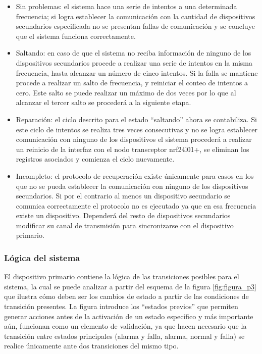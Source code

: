 \begin{itemize}
\item Sin problemas: el sistema hace una serie de intentos a una determinada frecuencia; si logra establecer la comunicación con la cantidad de dispositivos secundarios especificada no se presentan fallas de comunicación y se concluye que el sistema funciona correctamente.
\item Saltando: en caso de que el sistema no reciba información de ninguno de los dispositivos secundarios procede a realizar una serie de intentos en la misma frecuencia, hasta alcanzar un número de cinco intentos. Si la falla se mantiene procede a realizar un salto de frecuencia, y reiniciar el conteo de intentos a cero. Este salto se puede realizar un máximo de dos veces por lo que al alcanzar el tercer salto se procederá a la siguiente etapa. 
\item Reparación: el ciclo descrito para el estado ``saltando'' ahora se contabiliza. Si este ciclo de intentos se realiza tres veces consecutivas y no se logra establecer comunicación con ninguno de los dispositivos el sistema procederá a realizar un reinicio de la interfaz con el nodo transceptor nrf24l01+, se eliminan los registros asociados y comienza el ciclo nuevamente.
\item Incompleto: el protocolo de recuperación existe únicamente para casos en los que no se pueda establecer la comunicación con ninguno de los dispositivos secundarios. Si por el contrario al menos un dispositivo secundario se comunica correctamente el protocolo no es ejecutado ya que en esa frecuencia existe un dispositivo. Dependerá del resto de dispositivos secundarios modificar su canal de transmisión para sincronizarse con el dispositivo primario.  
\end{itemize}

\subsubsection{Lógica del sistema}

El dispositivo primario contiene la lógica de las transiciones posibles para el sistema, la cual se puede analizar a partir del esquema de la figura \ref{fig:figura_p3} que ilustra cómo deben ser los cambios de estado a partir de las condiciones de transición presentes. La figura introduce los  ``estados previos'' que permiten generar acciones antes de la activación de un estado específico y más importante aún, funcionan como un elemento de validación, ya que hacen necesario que la transición entre estados principales (alarma y falla, alarma, normal y falla) se realice únicamente ante dos transiciones del mismo tipo.

